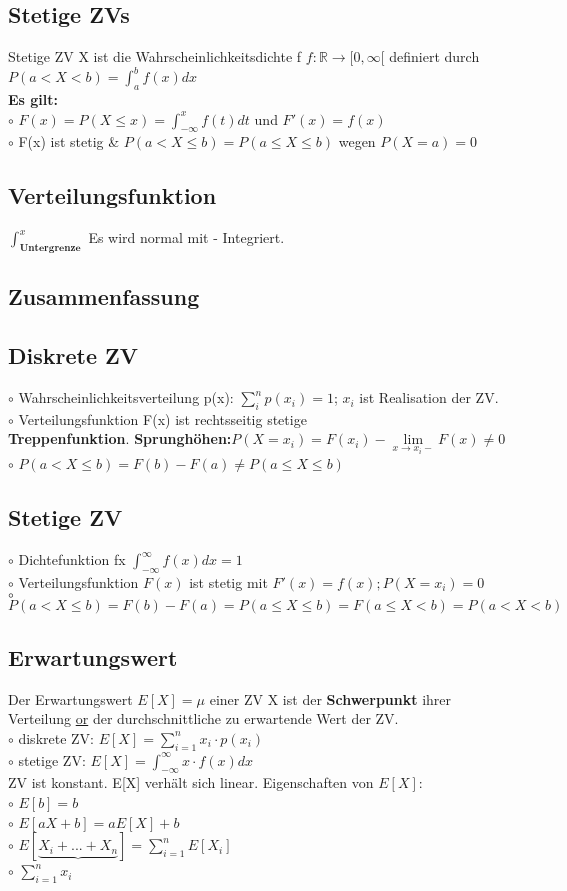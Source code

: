 \subsection{Stetige ZVs}
Stetige ZV X ist die Wahrscheinlichkeitsdichte f $ f : \mathbb{R} \rightarrow [0,\infty[$ definiert durch\\
$P(a < X < b) = \int_{a}^{b} f(x) dx$\\
\textbf{Es gilt:}\\
  $\circ$ $F(x) = P(X \leq x) = \int_{-\infty}^{x} f(t) dt$ und $F'(x) = f(x)$\\
  $\circ$ F(x) ist stetig \& $P(a < X \leq b) = P(a \leq X \leq b)$ wegen $P(X = a) = 0$
\subsection{Verteilungsfunktion}
$\int_{\textbf{Untergrenze}}^{x}$ Es wird normal mit - Integriert.
\subsection{Zusammenfassung}
\subsection{Diskrete ZV}
  $\circ$ Wahrscheinlichkeitsverteilung p(x): $\sum_{i}^{n} p(x_{i}) = 1$; 
    $x_{i}$ ist Realisation der ZV.\\
  $\circ$ Verteilungsfunktion F(x) ist rechtsseitig  stetige\\ \textbf{Treppenfunktion}. \textbf{Sprunghöhen:}$P(X = x_{i}) = F(x_{i}) - \lim\limits_{x \to x_{i}-} F(x) \ne 0$\\
  $\circ$ $P(a < X \le b) = F(b)- F(a) \ne P(a \le X \le b)$
\subsection{Stetige ZV}
  $\circ$ Dichtefunktion fx $\int_{-\infty}^{\infty} f(x) dx = 1$\\
  $\circ$ Verteilungsfunktion $F(x)$ ist stetig mit $F'(x) = f(x); P(X = x_{i}) = 0$\\
  $\circ$ $P(a < X \leq b ) = F(b) - F(a) = P( a \leq X \leq b) = F(a \leq X < b) = P(a < X < b)$
\subsection{Erwartungswert}
Der Erwartungswert $ E[X] = \mu $ einer ZV X ist der \textbf{Schwerpunkt} ihrer Verteilung \underline{or} der durchschnittliche zu erwartende Wert der ZV.\\
  $\circ$ diskrete ZV: $E[X] = \sum_{i=1}^{n} x_{i} \cdot p(x_{i})$\\
  $\circ$ stetige ZV: $E[X] = \int_{-\infty}^{\infty} x \cdot f(x) dx$\\
ZV ist konstant. E[X] verhält sich linear. Eigenschaften von $E[X]$:\\
  $\circ$ $E[b] = b$\\
  $\circ$ $E[aX + b] = aE[X] + b$\\
  $\circ$ $E[\underbrace{X_{i} + ... + X_{n}}] = \sum_{i=1}^{n} E[X_{i}]$\\
  $\circ$ $\sum_{i=1}^{n} x_{i}$
